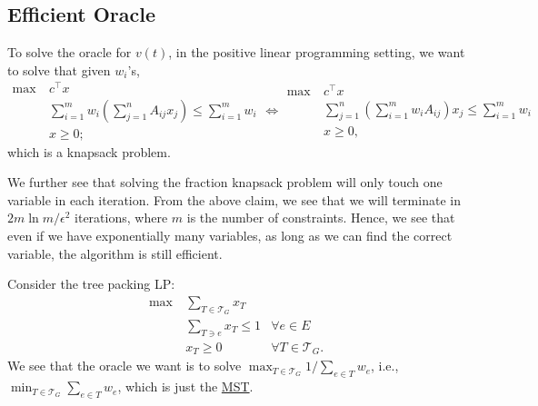 \subsection{Efficient Oracle}
\begin{prev}
	To solve the oracle for \(v (t)\), in the positive linear programming setting, we want to solve that given \(w_i\)'s,
	\[
		\begin{aligned}
			\max~ & c^{\top} x                                                                          \\
			      & \sum_{i=1}^{m} w_i \left( \sum_{j=1}^{n} A_{ij} x_j \right) \leq \sum_{i=1}^{m} w_i \\
			      & x \geq 0 ;
		\end{aligned}
		\iff \begin{aligned}
			\max~ & c^{\top} x                                                                          \\
			      & \sum_{j=1}^{n} \left( \sum_{i=1}^{m} w_i A_{ij} \right) x_j \leq \sum_{i=1}^{m} w_i \\
			      & x \geq 0 ,
		\end{aligned}
	\]
	which is a knapsack problem.
\end{prev}

We further see that solving the fraction knapsack problem will only touch one variable in each iteration. From the above claim, we see that we will terminate in \(2m \ln m / \epsilon ^2\) iterations, where \(m\) is the number of constraints. Hence, we see that even if we have exponentially many variables, as long as we can find the correct variable, the algorithm is still efficient.

\begin{eg}
	Consider the tree packing LP:
	\[
		\begin{aligned}
			\max~ & \sum_{T \in \mathcal{T} _G} x_T                                 \\
			      & \sum_{T \ni e} x_T \leq 1       & \forall e \in E               \\
			      & x_T \geq 0                      & \forall T \in \mathcal{T} _G.
		\end{aligned}
	\]
	We see that the oracle we want is to solve \(\max _{T \in \mathcal{T} _G} 1 / \sum_{e \in T} w_e\), i.e., \(\min _{T \in \mathcal{T} _G} \sum_{e \in T} w_e\), which is just the \hyperref[prb:MST]{MST}.
\end{eg}

